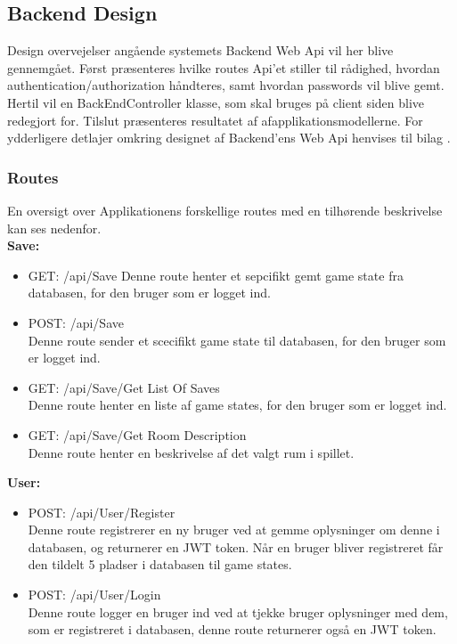 \subsection{Backend Design}
\label{ssec: Backend Design}
Design overvejelser  angående systemets Backend Web Api vil her blive gennemgået. Først præsenteres hvilke routes Api'et stiller til rådighed, hvordan authentication/authorization håndteres, samt hvordan passwords vil blive gemt. Hertil vil en BackEndController klasse, som skal bruges på client siden blive redegjort for. Tilslut præsenteres resultatet af afapplikationsmodellerne. For ydderligere detlajer omkring designet af Backend'ens Web Api henvises til bilag \parencite[][Section 8.4]{TekniskBilag}.

\subsubsection{Routes}
En oversigt over Applikationens forskellige routes med en tilhørende beskrivelse kan ses nedenfor.\\

\textbf{Save:}\\
\begin{itemize}
\item GET: /api/Save
Denne route henter et sepcifikt gemt game state fra databasen, for den bruger som er logget ind.
\item POST: /api/Save\\
Denne route sender et scecifikt game state til databasen, for den bruger som er logget ind.
\item GET: /api/Save/Get List Of Saves\\
Denne route henter en liste af game states, for den bruger som er logget ind. 
\item GET: /api/Save/Get Room Description\\
Denne route henter en beskrivelse af det valgt rum i spillet.
\end{itemize}

\textbf{User:}\\
\begin{itemize}
\item POST: /api/User/Register\\
Denne route registrerer en ny bruger ved at gemme oplysninger om denne i databasen, og returnerer en JWT token. Når en bruger bliver registreret får den tildelt 5 pladser i databasen til game states.
\item POST: /api/User/Login\\
Denne route logger en bruger ind ved at tjekke bruger oplysninger med dem, som er registreret i databasen, denne route returnerer også en JWT token.
\end{itemize}


